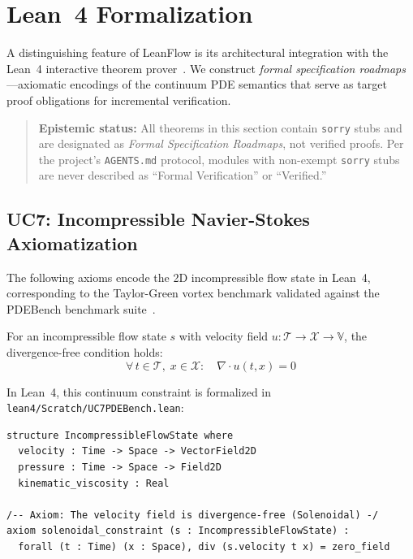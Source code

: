 
\section{Lean~4 Formalization}
\label{sec:formalization}

A distinguishing feature of LeanFlow is its architectural integration with the Lean~4 interactive theorem prover~\citep{moura2021lean4}. We construct \emph{formal specification roadmaps}---axiomatic encodings of the continuum PDE semantics that serve as target proof obligations for incremental verification.

\begin{quote}
\textbf{Epistemic status:} All theorems in this section contain \texttt{sorry} stubs and are designated as \emph{Formal Specification Roadmaps}, not verified proofs. Per the project's \texttt{AGENTS.md} protocol, modules with non-exempt \texttt{sorry} stubs are never described as ``Formal Verification'' or ``Verified.''
\end{quote}

\subsection{UC7: Incompressible Navier-Stokes Axiomatization}

The following axioms encode the 2D incompressible flow state in Lean~4, corresponding to the Taylor-Green vortex benchmark validated against the PDEBench benchmark suite~\citep{takamoto2022pdebench}.

\begin{axiom}
\label{ax:solenoidal}
For an incompressible flow state $s$ with velocity field $u : \mathcal{T} \to \mathcal{X} \to \mathbb{V}$, the divergence-free condition holds:
\begin{equation}
  \forall\, t \in \mathcal{T},\; x \in \mathcal{X}: \quad 
  \nabla \cdot u(t, x) = 0
\end{equation}
\end{axiom}

\noindent In Lean~4, this continuum constraint is formalized in \texttt{lean4/Scratch/UC7PDEBench.lean}:

\begin{lstlisting}[caption={Solenoidal constraint formalization (\texttt{Scratch.UC7PDEBench})}]
structure IncompressibleFlowState where
  velocity : Time -> Space -> VectorField2D
  pressure : Time -> Space -> Field2D
  kinematic_viscosity : Real

/-- Axiom: The velocity field is divergence-free (Solenoidal) -/
axiom solenoidal_constraint (s : IncompressibleFlowState) :
  forall (t : Time) (x : Space), div (s.velocity t x) = zero_field
\end{lstlisting}


